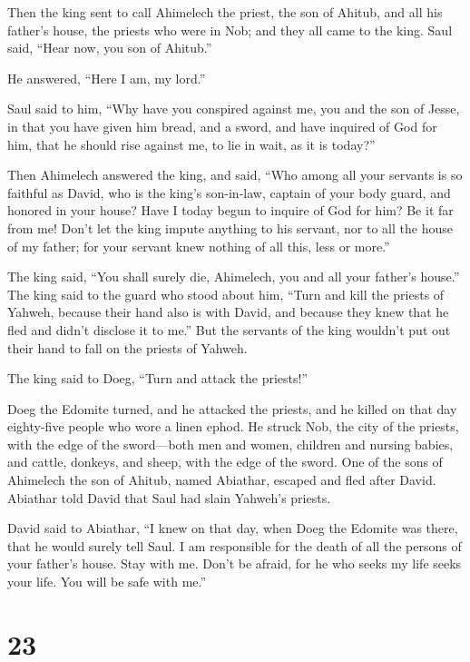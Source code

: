  Then the king sent to call Ahimelech the priest, the son
of Ahitub, and all his father's house, the priests who were in Nob; and
they all came to the king.  Saul said, ``Hear now, you son
of Ahitub.''

He answered, ``Here I am, my lord.''

 Saul said to him, ``Why have you conspired against me, you
and the son of Jesse, in that you have given him bread, and a sword, and
have inquired of God for him, that he should rise against me, to lie in
wait, as it is today?''

 Then Ahimelech answered the king, and said, ``Who among
all your servants is so faithful as David, who is the king's son-in-law,
captain of your body guard, and honored in your house? 
Have I today begun to inquire of God for him? Be it far from me! Don't
let the king impute anything to his servant, nor to all the house of my
father; for your servant knew nothing of all this, less or more.''

 The king said, ``You shall surely die, Ahimelech, you and
all your father's house.''  The king said to the guard who
stood about him, ``Turn and kill the priests of Yahweh, because their
hand also is with David, and because they knew that he fled and didn't
disclose it to me.'' But the servants of the king wouldn't put out their
hand to fall on the priests of Yahweh.

 The king said to Doeg, ``Turn and attack the priests!''

Doeg the Edomite turned, and he attacked the priests, and he killed on
that day eighty-five people who wore a linen ephod.  He
struck Nob, the city of the priests, with the edge of the sword---both
men and women, children and nursing babies, and cattle, donkeys, and
sheep, with the edge of the sword.  One of the sons of
Ahimelech the son of Ahitub, named Abiathar, escaped and fled after
David.  Abiathar told David that Saul had slain Yahweh's
priests.

 David said to Abiathar, ``I knew on that day, when Doeg
the Edomite was there, that he would surely tell Saul. I am responsible
for the death of all the persons of your father's house. 
Stay with me. Don't be afraid, for he who seeks my life seeks your life.
You will be safe with me.''

\hypertarget{section-22}{%
\section{23}\label{section-22}}

